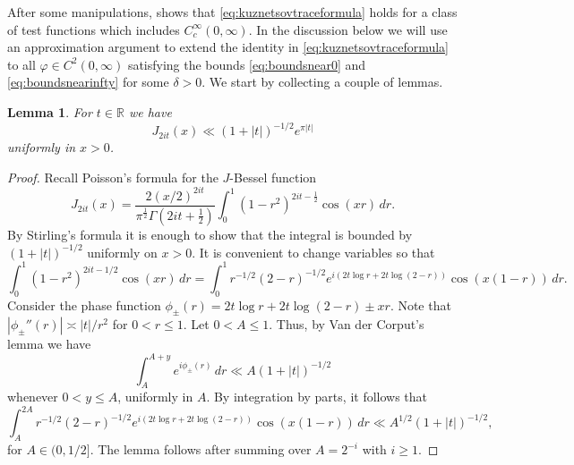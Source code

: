 \documentclass{article}
\newtheorem{lem}[thm]{Lemma}
\theoremstyle{named}
\newcommand{\R}{\mathbb{R}}
\begin{document}
After some manipulations, \cite[Equation (84)]{proskurinarbitraryweightkuznetsov} shows that \eqref{eq:kuznetsovtraceformula} holds for a class of test functions which includes $C_c^\infty(0, \infty)$. In the discussion below we will use an approximation argument to extend the identity in \eqref{eq:kuznetsovtraceformula} to all $\varphi \in C^2(0, \infty)$ satisfying the bounds \eqref{eq:boundsnear0} and \eqref{eq:boundsnearinfty} for some $\delta > 0$. We start by collecting a couple of lemmas. 
\begin{lem}
For $t \in \R$ we have
\begin{equation}\label{eq:uniformboundonJBesselfunction}
    J_{2it}(x) \ll (1 + |t|)^{-1/2}e^{\pi |t|}
\end{equation}
uniformly in $x > 0$. 
\end{lem}
\begin{proof}
    Recall Poisson's formula for the $J$-Bessel function \cite[\href{https://dlmf.nist.gov/10.9.E4}{(10.9.4)}]{dlmf}
\begin{equation*}
    J_{2it}(x) = \frac{2(x/2)^{2it}}{\pi^{\frac{1}{2}}\Gamma\left(2it + \frac{1}{2}\right)} \int_0^1 (1 - r^2)^{2it - \frac{1}{2}} \cos(xr) \, dr.
\end{equation*}
By Stirling's formula it is enough to show that the integral is bounded by $(1 + |t|)^{-1/2}$ uniformly on $x > 0$.
It is convenient to change variables so that 
\begin{equation*}
    \int_0^1 (1 - r^2)^{2it - 1/2}\cos(xr) \, dr = \int_0^1 r^{-1/2}(2-r)^{-1/2} e^{i(2t \log r + 2t \log (2-r))} \cos(x(1-r))\, dr.
\end{equation*}
Consider the phase function $\phi_{\pm}(r) = 2t \log r + 2t \log (2-r) \pm xr$. Note that 
$|\phi_{\pm}''(r)| \asymp  |t|/r^2$ for $0 < r \leq 1$. Let $0 < A \leq 1$. Thus, by Van der Corput's lemma \cite[Proposition 2.6.7]{grafakosclassical} we have 
\begin{equation*}
    \int_A^{A + y}  e^{i\phi_{\pm}(r)}\, dr \ll A(1 + |t|)^{-1/2}
\end{equation*}
whenever $0 < y \leq A$, uniformly in $A$. By integration by parts, it follows that  
\begin{equation*}
    \int_A^{2A} r^{-1/2}(2-r)^{-1/2} e^{i(2t \log r + 2t \log (2-r))} \cos(x(1-r))\, dr \ll A^{1/2}(1 + |t|)^{-1/2},
\end{equation*}
for $A \in (0, 1/2]$. The lemma follows after summing over $A = 2^{-i}$ with  $i \geq 1$.
\end{proof}
\end{document}
